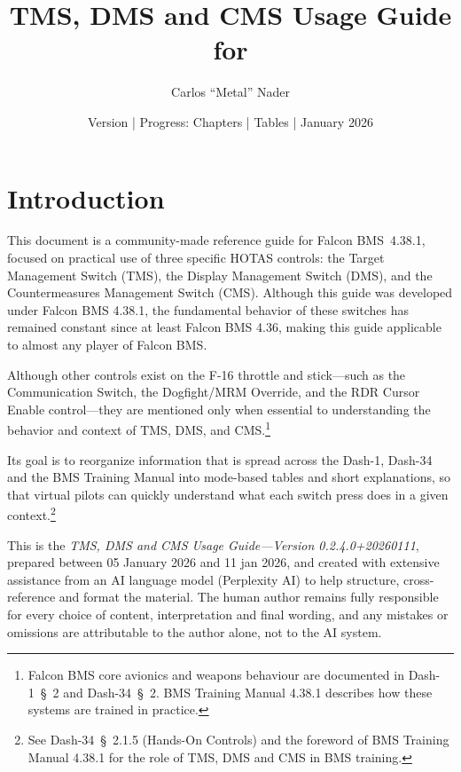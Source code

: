 \documentclass[11pt,a4paper]{article}
\title{TMS, DMS and CMS Usage Guide for \bmsver}
\author{Carlos ``Metal'' Nader}
\date{Version \fulldocversion{} | Progress: Chapters \chapterscompletedof{} | Tables \tablesfilledpct{} | January 2026}
\providecommand{\dashref}[1]{Dash-34~\S~#1}
\providecommand{\dashone}[1]{Dash-1~\S~#1}
\providecommand{\trnman}{BMS Training Manual 4.38.1}
\providecommand{\bmsver}{Falcon BMS~4.38.1}
\newcommand{\docversion}{0.2.4.0} %
\newcommand{\docbuild}{20260111}
\newcommand{\docstartdate}{05 January 2026}
\newcommand{\docenddate}{11 jan 2026}
\newcommand{\fulldocversion}{\docversion+\docbuild}
\begin{document}
\maketitle

\newpage
\tableofcontents
\newpage
{}

\section{Introduction}

This document is a community-made reference guide for \bmsver, focused on practical use of three specific HOTAS controls: the Target Management Switch (TMS), the Display Management Switch (DMS), and the Countermeasures Management Switch (CMS). Although this guide was developed under Falcon BMS 4.38.1, the fundamental behavior of these switches has remained constant since at least Falcon BMS 4.36, making this guide applicable to almost any player of Falcon BMS.

Although other controls exist on the F-16 throttle and stick---such as the Communication Switch, the Dogfight/MRM Override, and the RDR Cursor Enable control---they are mentioned only when essential to understanding the behavior and context of TMS, DMS, and CMS.\footnote{Falcon BMS core avionics and weapons behaviour are documented in \dashone{2} and \dashref{2}. \trnman{} describes how these systems are trained in practice.}

Its goal is to reorganize information that is spread across the Dash-1, Dash-34 and the BMS Training Manual into mode-based tables and short explanations, so that virtual pilots can quickly understand what each switch press does in a given context.\footnote{See \dashref{2.1.5} (Hands-On Controls) and the foreword of \trnman{} for the role of TMS, DMS and CMS in BMS training.}

This is the \emph{TMS, DMS and CMS Usage Guide---Version \fulldocversion}, prepared between \docstartdate{} and \docenddate{}, and created with extensive assistance from an AI language model (Perplexity AI) to help structure, cross-reference and format the material. The human author remains fully responsible for every choice of content, interpretation and final wording, and any mistakes or omissions are attributable to the author alone, not to the AI system.
\end{document}
